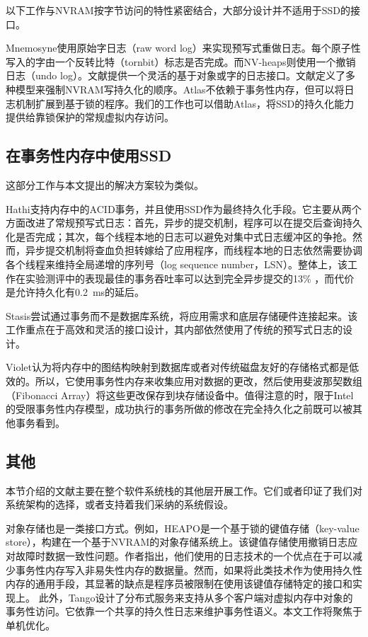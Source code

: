 以下工作与NVRAM按字节访问的特性紧密结合，大部分设计并不适用于SSD的接口。

Mnemosyne\cite{Volos:2011:MLP:1950365.1950379}使用原始字日志（raw word log）来实现预写式重做日志。每个原子性写入的字由一个反转比特（tornbit）标志是否完成。而NV-heaps\cite{Coburn:2011:NMP:1950365.1950380}则使用一个撤销日志（undo log）。文献\cite{Kannan:2014:RCP}提供一个灵活的基于对象或字的日志接口。文献\cite{Pelley:2014:MP}定义了多种模型来强制NVRAM写持久化的顺序。Atlas\cite{Chakrabarti:2014:ALL:2660193.2660224}不依赖于事务性内存，但可以将日志机制扩展到基于锁的程序。我们的工作也可以借助Atlas，将SSD的持久化能力提供给靠锁保护的常规虚拟内存访问。

\subsection{在事务性内存中使用SSD}

这部分工作与本文提出的解决方案较为类似。

Hathi\cite{Saxena:2012:HDT:2236584.2236589}支持内存中的ACID事务，并且使用SSD作为最终持久化手段。它主要从两个方面改进了常规预写式日志：首先，异步的提交机制，程序可以在提交后查询持久化是否完成；其次，每个线程本地的日志可以避免对集中式日志缓冲区的争抢。然而，异步提交机制将查血负担转嫁给了应用程序，而线程本地的日志依然需要协调各个线程来维持全局递增的序列号（log sequence number，LSN）。整体上，该工作在实验测评中的表现最佳的事务吞吐率可以达到完全异步提交的13\% ，而代价是允许持久化有0.2~ms的延后。

Stasis\cite{Sears:2006:SFT:1298455.1298459}尝试通过事务而不是数据库系统，将应用需求和底层存储硬件连接起来。该工作重点在于高效和灵活的接口设计，其内部依然使用了传统的预写式日志的设计。

Violet\cite{Santry:2014:VSS:2643634.2643637}认为将内存中的图结构映射到数据库或者对传统磁盘友好的存储格式都是低效的。所以，它使用事务性内存来收集应用对数据的更改，然后使用斐波那契数组（Fibonacci Array）将这些更改保存到块存储设备中。值得注意的时，限于Intel的受限事务性内存模型，成功执行的事务所做的修改在完全持久化之前既可以被其他事务看到。

\subsection{其他}

本节介绍的文献主要在整个软件系统栈的其他层开展工作。它们或者印证了我们对系统架构的选择，或者支持着我们采纳的系统假设。

对象存储也是一类接口方式。例如，HEAPO\cite{Hwang:2014:HHP:2705611.2629619}是一个基于锁的键值存储（key-value store），构建在一个基于NVRAM的对象存储系统上。该键值存储使用撤销日志应对故障时数据一致性问题。作者指出，他们使用的日志技术的一个优点在于可以减少事务性内存写入非易失性内存的数据量。然而，如果将此类技术作为使用持久性内存的通用手段，其显著的缺点是程序员被限制在使用该键值存储特定的接口和实现上。
此外，Tango\cite{Balakrishnan:2013:TDD:2517349.2522732}设计了分布式服务来支持从多个客户端对虚拟内存中对象的事务性访问。它依靠一个共享的持久性日志来维护事务性语义。本文工作将聚焦于单机优化。

